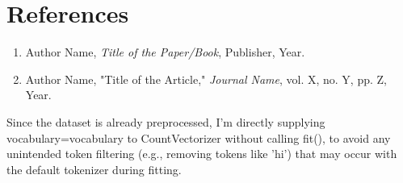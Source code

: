 \documentclass[a4paper,12pt]{article}
\begin{document}
\section*{References}
\begin{enumerate}
    \item Author Name, \textit{Title of the Paper/Book}, Publisher, Year.
    \item Author Name, "Title of the Article," \textit{Journal Name}, vol. X, no. Y, pp. Z, Year.
\end{enumerate}


Since the dataset is already preprocessed, I'm directly supplying vocabulary=vocabulary to CountVectorizer without calling fit(), to avoid any unintended token filtering (e.g., removing tokens like 'hi') that may occur with the default tokenizer during fitting.
\end{document}
